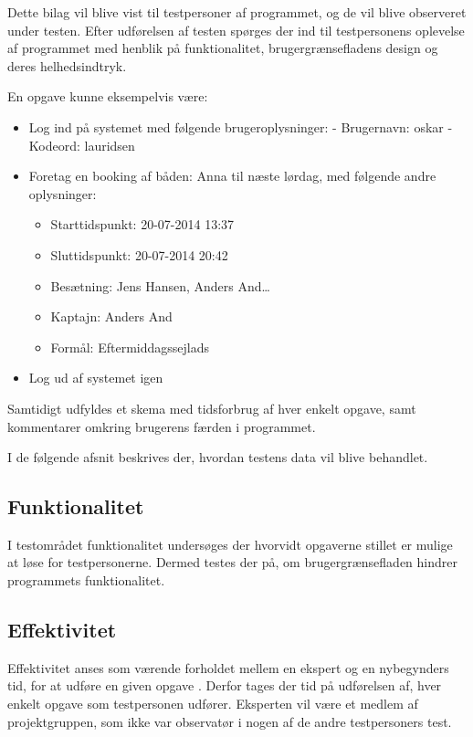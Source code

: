 Dette bilag vil blive vist til testpersoner af programmet, og de vil blive observeret under testen. 
Efter udførelsen af testen spørges der ind til testpersonens oplevelse af programmet med henblik på funktionalitet, brugergrænsefladens design og deres helhedsindtryk.

En opgave kunne eksempelvis være:
\begin{itemize}
	\item Log ind på systemet med følgende brugeroplysninger:
	\newline - Brugernavn: oskar
	\newline - Kodeord: lauridsen
	\item Foretag en booking af båden: Anna til næste lørdag, med følgende andre oplysninger: 
	\begin{itemize}
		\item Starttidspunkt: 20-07-2014 13:37
		\item Sluttidspunkt: 20-07-2014 20:42
		\item Besætning: Jens Hansen, Anders And\ldots
		\item Kaptajn: Anders And
		\item Formål: Eftermiddagssejlads
	\end{itemize}
	\item Log ud af systemet igen
\end{itemize}

Samtidigt udfyldes et skema med tidsforbrug af hver enkelt opgave, samt kommentarer omkring brugerens færden i programmet.

I de følgende afsnit beskrives der, hvordan testens data vil blive behandlet.

\subsection{Funktionalitet}
I testområdet funktionalitet undersøges der hvorvidt opgaverne stillet er mulige at løse for testpersonerne.
Dermed testes der på, om brugergrænsefladen hindrer programmets funktionalitet. 

\subsection{Effektivitet}
Effektivitet anses som værende forholdet mellem en ekspert og en nybegynders tid, for at udføre en given opgave \citep{UIEffeciency}.
Derfor tages der tid på udførelsen af, hver enkelt opgave som testpersonen udfører.
Eksperten vil være et medlem af projektgruppen, som ikke var observatør i nogen af de andre testpersoners test. 

